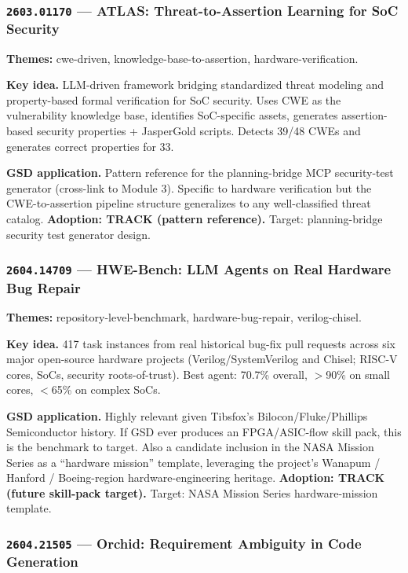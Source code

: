 \documentclass[11pt,letterpaper]{article}
\newcommand{\arxivid}[1]{\texttt{\textcolor{accent}{#1}}}
\newcommand{\paperhead}[2]{\noindent\textbf{\sffamily\textcolor{secondary}{#1}} \textemdash{} #2}
\begin{document}
\subsubsection{\arxivid{2603.01170} --- ATLAS: Threat-to-Assertion Learning for SoC Security}

\paperhead{Themes:}{cwe-driven, knowledge-base-to-assertion, hardware-verification.}

\textbf{Key idea.} LLM-driven framework bridging standardized threat modeling and property-based formal verification for SoC security. Uses CWE as the vulnerability knowledge base, identifies SoC-specific assets, generates assertion-based security properties + JasperGold scripts. Detects 39/48 CWEs and generates correct properties for 33.

\textbf{GSD application.} Pattern reference for the planning-bridge MCP security-test generator (cross-link to Module 3). Specific to hardware verification but the CWE-to-assertion pipeline structure generalizes to any well-classified threat catalog. \textbf{Adoption: TRACK (pattern reference).} Target: planning-bridge security test generator design.

\subsubsection{\arxivid{2604.14709} --- HWE-Bench: LLM Agents on Real Hardware Bug Repair}

\paperhead{Themes:}{repository-level-benchmark, hardware-bug-repair, verilog-chisel.}

\textbf{Key idea.} 417 task instances from real historical bug-fix pull requests across six major open-source hardware projects (Verilog/SystemVerilog and Chisel; RISC-V cores, SoCs, security roots-of-trust). Best agent: 70.7\% overall, $>$90\% on small cores, $<$65\% on complex SoCs.

\textbf{GSD application.} Highly relevant given Tibsfox's Bilocon/Fluke/Phillips Semiconductor history. If GSD ever produces an FPGA/ASIC-flow skill pack, this is the benchmark to target. Also a candidate inclusion in the NASA Mission Series as a ``hardware mission'' template, leveraging the project's Wanapum / Hanford / Boeing-region hardware-engineering heritage. \textbf{Adoption: TRACK (future skill-pack target).} Target: NASA Mission Series hardware-mission template.

\subsubsection{\arxivid{2604.21505} --- Orchid: Requirement Ambiguity in Code Generation}
\end{document}
